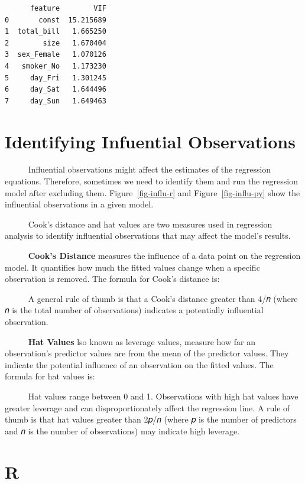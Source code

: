 \documentclass[
  letterpaper,
  DIV=11,
  numbers=noendperiod]{scrreprt}
\begin{document}
\begin{verbatim}
      feature        VIF
0       const  15.215689
1  total_bill   1.665250
2        size   1.670404
3  sex_Female   1.070126
4   smoker_No   1.173230
5     day_Fri   1.301245
6     day_Sat   1.644496
7     day_Sun   1.649463
\end{verbatim}

\section{Identifying Infuential
Observations}\label{identifying-infuential-observations}

~~~~~ Influential observations might affect the estimates of the
regression equations. Therefore, sometimes we need to identify them and
run the regression model after excluding them. Figure~\ref{fig-influ-r}
and Figure~\ref{fig-influ-py} show the influential observations in a
given model.

~~~~~ Cook's distance and hat values are two measures used in regression
analysis to identify influential observations that may affect the
model's results.

~~~~~ \textbf{Cook's Distance} measures the influence of a data point on
the regression model. It quantifies how much the fitted values change
when a specific observation is removed. The formula for Cook's distance
is:

~~~~~ A general rule of thumb is that a Cook's distance greater than 4/𝑛
(where 𝑛 is the total number of observations) indicates a potentially
influential observation.

~~~~~ \textbf{Hat Values} lso known as leverage values, measure how far
an observation's predictor values are from the mean of the predictor
values. They indicate the potential influence of an observation on the
fitted values. The formula for hat values is:

~~~~~ Hat values range between 0 and 1. Observations with high hat
values have greater leverage and can disproportionately affect the
regression line. A rule of thumb is that hat values greater than 2𝑝/𝑛
(where 𝑝 is the number of predictors and 𝑛 is the number of
observations) may indicate high leverage.

\section{R}
\end{document}
